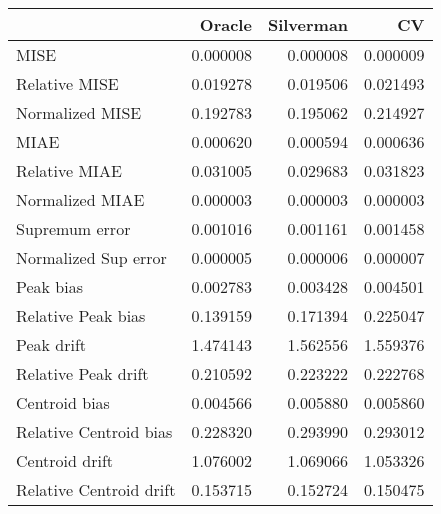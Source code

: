\begin{tabular}{lrrr}
  \toprule
 & Oracle & Silverman & CV \\ 
  \midrule
MISE & 0.000008 & 0.000008 & 0.000009 \\ 
  Relative MISE & 0.019278 & 0.019506 & 0.021493 \\ 
  Normalized MISE & 0.192783 & 0.195062 & 0.214927 \\ 
  MIAE & 0.000620 & 0.000594 & 0.000636 \\ 
  Relative MIAE & 0.031005 & 0.029683 & 0.031823 \\ 
  Normalized MIAE & 0.000003 & 0.000003 & 0.000003 \\ 
  Supremum error & 0.001016 & 0.001161 & 0.001458 \\ 
  Normalized Sup error & 0.000005 & 0.000006 & 0.000007 \\ 
  Peak bias & 0.002783 & 0.003428 & 0.004501 \\ 
  Relative Peak bias & 0.139159 & 0.171394 & 0.225047 \\ 
  Peak drift & 1.474143 & 1.562556 & 1.559376 \\ 
  Relative Peak drift & 0.210592 & 0.223222 & 0.222768 \\ 
  Centroid bias & 0.004566 & 0.005880 & 0.005860 \\ 
  Relative Centroid bias & 0.228320 & 0.293990 & 0.293012 \\ 
  Centroid drift & 1.076002 & 1.069066 & 1.053326 \\ 
  Relative Centroid drift & 0.153715 & 0.152724 & 0.150475 \\ 
   \bottomrule
\end{tabular}
